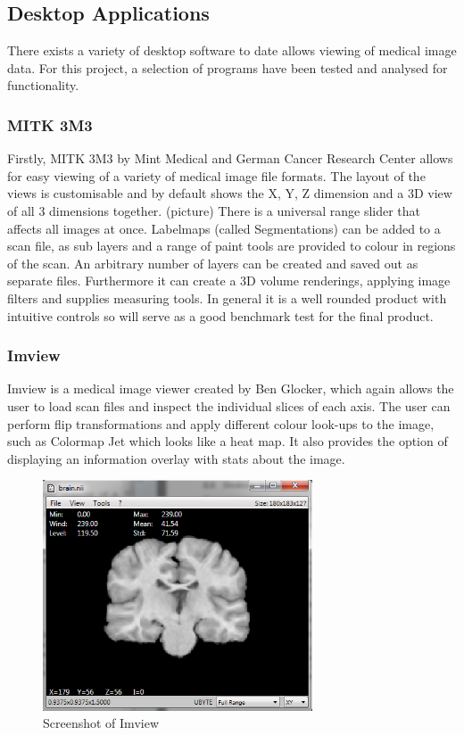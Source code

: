 \documentclass[a4paper,11pt,titlepage]{article}
\begin{document}
	


\subsection{Desktop Applications}

There exists a variety of desktop software to date allows viewing of medical image data. For this project, a selection of programs have been tested and analysed for functionality.

\subsubsection{MITK 3M3}
     Firstly, MITK 3M3 by Mint Medical and German Cancer Research Center allows for easy viewing of a variety of medical image file formats. The layout of the views is customisable and by default shows the X, Y, Z dimension and a 3D view of all 3 dimensions together. (picture) There is a universal range slider that affects all images at once. Labelmaps (called Segmentations) can be added to a scan file, as sub layers and a range of paint tools are provided to colour in regions of the scan. An arbitrary number of layers can be created and saved out as separate files. 
     Furthermore it can create a 3D volume renderings, applying image filters and supplies measuring tools. In general it is a well rounded product with intuitive controls so will serve as a good benchmark test for the final product.

\subsubsection{Imview}
Imview is a medical image viewer created by Ben Glocker, which again allows the user to load scan files and inspect the individual slices of each axis. The user can perform flip transformations and apply different colour look-ups to the image, such as Colormap Jet which looks like a heat map. It also provides the option of displaying an information overlay with stats about the image.

\begin{figure}[ht!]
\centering
\includegraphics[width=80mm]{graphics/imview_01.png}
\caption{Screenshot of Imview}
\label{fig:UIdesign1}
\end{figure}
\end{document}
